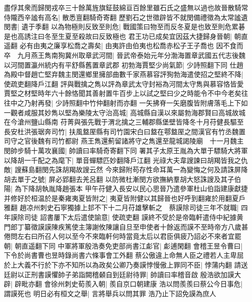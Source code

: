 盡俘其衆而歸閔戎卒三十餘萬旌旗鉦鼓綿亘百餘里雖石氏之盛無以過也故晉散騎常侍隴西辛謐有高名|{
	散悉亶翻騎奇寄翻}
歷劉石之世徵辟皆不就閔備禮徵為太常謐遺閔書|{
	遺于季翻}
以為物極則反致至則危|{
	戰國策曰物至而反冬夏是也致至則危累碁是也高誘注曰冬至生夏至殺故曰反致極也}
君王功已成矣宜因茲大捷歸身晉朝|{
	朝直遥翻}
必有由夷之廉享松喬之壽矣|{
	由夷許由伯夷也松喬赤松子王子喬也}
因不食而卒　九月燕王雋南狥冀州取章武河間|{
	晉武帝泰始元年分渤海置章武國五代志後魏以河間置瀛州統内有平舒縣舊置章武郡}
初勃海賈堅少尚氣節|{
	少詩照翻下同}
仕趙為殿中督趙亡堅弃魏主閔還鄉里擁部曲數千家燕慕容評狥勃海遣使招之堅終不降|{
	使疏吏翻降戶江翻}
評與戰擒之雋以評為章武太守封裕為河間太守雋與慕容恪皆愛賈堅之材堅時年六十餘恪聞其善射置牛百步上以試之堅曰少之時能令不中今老矣往往中之乃射再發|{
	少詩照翻中竹仲翻射而亦翻}
一矢拂脊一矢磨腹皆附膚落毛上下如一觀者咸服其妙雋以堅為樂陵太守治高城|{
	高城縣自漢以來屬勃海郡賢曰高城故城在今滄州鹽山縣南}
苻菁與張先戰于渭北擒之三輔郡縣堡壁皆降冬十月苻健長驅至長安杜洪張琚奔司竹|{
	扶風盩厔縣有司竹園宋白曰盩在鄠盩厔之間漢官有竹丞魏置司守之官後魏有司竹都尉}
燕王雋還薊留諸將守之雋還至龍城謁陵廟　十一月魏主閔帥步騎十萬攻襄國|{
	帥讀曰率騎奇寄翻下同}
署其子太原王胤為大單于驃騎大將軍以降胡一千配之為麾下|{
	單音蟬驃匹妙翻降戶江翻}
光祿大夫韋謏諫曰胡羯皆我之仇敵|{
	謏蘇島翻閔先誅胡羯故謏云然}
今來歸附苟存性命耳萬一為變悔之何及請誅屏降胡去單于之號|{
	屏必郢翻去羌呂翻}
以防微杜漸閔方欲撫納羣胡大怒誅謏及其子伯陽|{
	為下降胡執胤降趙張本}
甲午苻健入長安以民心思晉乃遣參軍杜山伯詣建康獻捷并修好於桓温於是秦雍夷夏皆附之|{
	夷夏皆附健以其歸晉也好呼到翻雍於用翻夏戶雅翻}
趙凉州刺史石寧獨據上邽不下十二月苻雄擊斬之　蔡謨除司徒三年不就職|{
	四年謨除司徒}
詔書屢下太后遣使諭意|{
	使疏吏翻}
謨終不受於是帝臨軒遣侍中紀據黄門郎丁纂徵謨謨陳疾篤使主簿謝攸陳讓自旦至申使者十餘返而謨不至時帝方八歲甚倦問左右曰所召人何以至今不來臨軒何時當竟太后以君臣俱疲乃詔必不來者宜罷朝|{
	朝直遥翻下同}
中軍將軍殷浩奏免吏部尚書江虨官|{
	虨逋閑翻}
會稽王昱令曹曰|{
	下令於尚書曹也昱時錄尚書六條事會工外翻}
蔡公傲違上命無人臣之禮若人主卑屈於上大義不行於下亦不知所以為政矣公卿乃奏謨悖慢傲上罪同不臣|{
	悖蒲内翻}
請送廷尉以正刑書謨懼帥子弟詣闕稽顙自到廷尉待罪|{
	帥讀曰率稽音啟}
殷浩欲加謨大辟|{
	辟毗亦翻}
會徐州刺史荀羨入朝|{
	羨自京口朝建康}
浩以問羨羨曰蔡公今日事危|{
	謂謨死也}
明日必有桓文之舉|{
	言將舉兵以問其罪}
浩乃止下詔免謨為庶人

